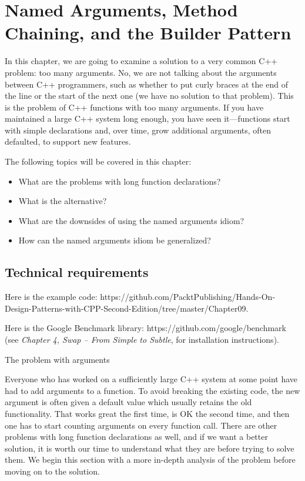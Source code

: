 ﻿\chapter{Named Arguments, Method Chaining, and the Builder Pattern}

In this chapter, we are going to examine a solution to a very common C++ problem: too many arguments. No, we are not talking about the arguments between C++ programmers, such as whether to put curly braces at the end of the line or the start of the next one (we have no solution to that problem). This is the problem of C++ functions with too many arguments. If you have maintained a large C++ system long enough, you have seen it---functions start with simple declarations and, over time, grow additional arguments, often defaulted, to support new features.

The following topics will be covered in this chapter:

\begin{itemize}
\item
  What are the problems with long function declarations?
\item
  What is the alternative?
\item
  What are the downsides of using the named arguments idiom?
\item
  How can the named arguments idiom be generalized?
\end{itemize}

\section{Technical requirements}

Here is the example code: https://github.com/PacktPublishing/Hands-On-Design-Patterns-with-CPP-Second-Edition/tree/master/Chapter09.

Here is the Google Benchmark library: https://github.com/google/benchmark (see \emph{Chapter 4, Swap -- From Simple to Subtle}, for installation instructions).

The problem with arguments

Everyone who has worked on a sufficiently large C++ system at some point have had to add arguments to a function. To avoid breaking the existing code, the new argument is often given a default value which usually retains the old functionality. That works great the first time, is OK the second time, and then one has to start counting arguments on every function call. There are other problems with long function declarations as well, and if we want a better solution, it is worth our time to understand what they are before trying to solve them. We begin this section with a more in-depth analysis of the problem before moving on to the solution.

